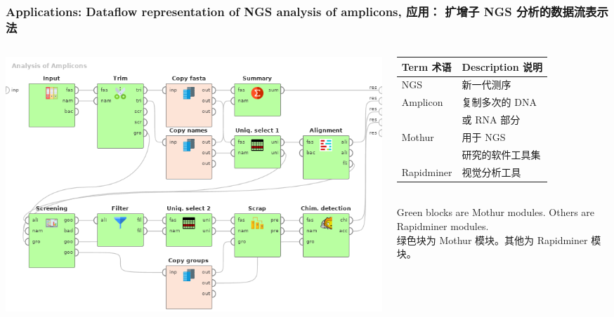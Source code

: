 \documentclass[10pt]{beamer}
\begin{document}


\begin{frame}
  \frametitle{Applications: Dataflow representation of NGS analysis of amplicons, 应用： 扩增子 NGS 分析的数据流表示法}
  \begin{columns}
    \begin{column}{0.6\textwidth}
      \begin{raggedright}
        \includegraphics[width=1\linewidth]{Dataflow-color-en.png}
      \end{raggedright}
    \end{column}
    \begin{column}{0.4\textwidth}\footnotesize
      \begin{tabular}{ll}
        Term 术语 & Description 说明 \\
        \hline
        NGS & 新一代测序 \\
        Amplicon & 复制多次的 DNA \\ & 或 RNA 部分 \\
        Mothur & 用于 NGS \\ & 研究的软件工具集 \\
        Rapidminer & 视觉分析工具 \\
      \end{tabular}
      ${}$\\[1em]
      Green blocks are Mothur modules. Others are Rapidminer modules.\\ 绿色块为 Mothur 模块。其他为 Rapidminer 模块。
    \end{column}
  \end{columns}
\end{frame}
\end{document}
